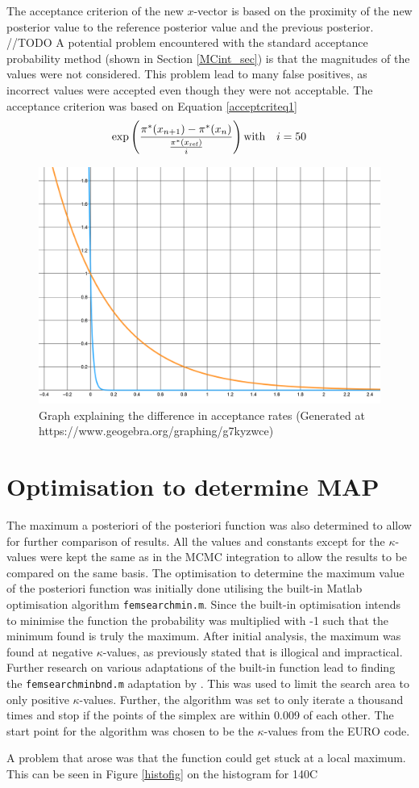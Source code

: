 %	
	
	The acceptance criterion of the new $x$-vector is based on the proximity of the new posterior value to the reference posterior value and the previous posterior. //TODO
	A potential problem encountered with the standard acceptance probability method (shown in Section \ref{MCint_sec}) is that the magnitudes of the values were not considered. 
	This problem lead to many false positives, as incorrect values were accepted even though they were not acceptable. 
	The acceptance criterion was based on Equation \ref{acceptcriteq1}
	\begin{equation}\label{acceptcriteq1}
	\exp\left(\frac {\pi^*(x_{n+1})-\pi^*(x_n)}{\frac{\pi^*(x_{\text{ref}})}{i}}\right)\\
	\text{with} \quad i = 50\\
	\end{equation}
	
	\begin{figure}[H]
	\centering
	\includegraphics[width = 0.5\linewidth]{figures/e_expl_curve.png}
	\caption{Graph explaining the difference in acceptance rates (Generated at https://www.geogebra.org/graphing/g7kyzwce)}
	\end{figure}
	 
	
	
	\section{Optimisation to determine MAP}
The maximum a posteriori of the posteriori function was also determined to allow for further comparison of results.
All the values and constants except for the $\kappa$-values were kept the same as in the MCMC integration to allow the results to be compared on the same basis.  
	The optimisation to determine the maximum value of the posteriori function was initially done utilising the built-in Matlab optimisation algorithm \texttt{femsearchmin.m}. 
	Since the built-in optimisation intends to minimise the function the probability was multiplied with -1 such that the minimum found is truly the maximum.
	After initial analysis, the maximum was found at negative $\kappa$-values, as previously stated that is illogical and impractical.
	Further research on various adaptations of the built-in function lead to finding the \texttt{femsearchminbnd.m} adaptation by \citet{derrico:2021}. 
	This was used to limit the search area to only positive $\kappa$-values.
	Further, the algorithm was set to only iterate a thousand times and stop if the points of the simplex are within 0.009 of each other.
	The start point for the algorithm was chosen to be the $\kappa$-values from the EURO code.
	
	A problem that arose was that the function could get stuck at a local maximum.
	This can be seen in Figure \ref{histofig} on the histogram for 140\textdegree C
	
	
